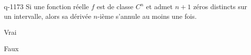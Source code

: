\begin{truefalse}{q-1173}
Si une fonction réelle $f$ est de classe $C^n$ et admet $n+1$ zéros distincts sur un intervalle, alors sa dérivée $n$-ième s'annule au moins une fois.
\item* Vrai
\item Faux
\end{truefalse}

